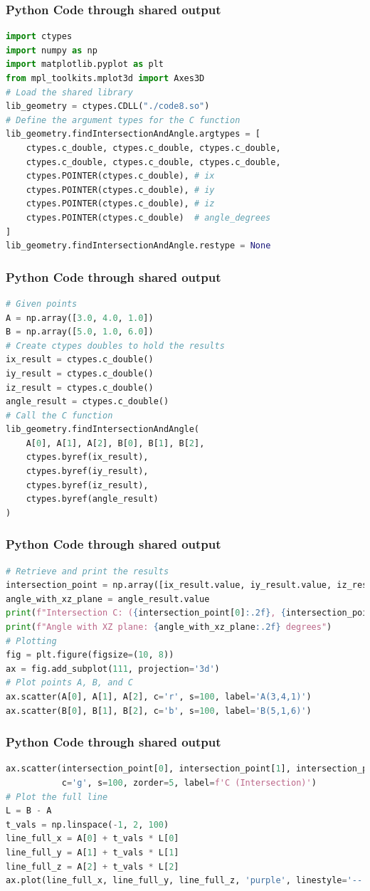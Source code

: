 \documentclass{beamer}
\begin{document}
\begin{frame}[fragile]
\frametitle{Python Code through shared output}
\begin{lstlisting}[language=Python]
import ctypes
import numpy as np
import matplotlib.pyplot as plt
from mpl_toolkits.mplot3d import Axes3D
# Load the shared library
lib_geometry = ctypes.CDLL("./code8.so")
# Define the argument types for the C function
lib_geometry.findIntersectionAndAngle.argtypes = [
    ctypes.c_double, ctypes.c_double, ctypes.c_double,
    ctypes.c_double, ctypes.c_double, ctypes.c_double,
    ctypes.POINTER(ctypes.c_double), # ix
    ctypes.POINTER(ctypes.c_double), # iy
    ctypes.POINTER(ctypes.c_double), # iz
    ctypes.POINTER(ctypes.c_double)  # angle_degrees
]
lib_geometry.findIntersectionAndAngle.restype = None
\end{lstlisting}
\end{frame}
\begin{frame}[fragile]
\frametitle{Python Code through shared output}
\begin{lstlisting}[language=Python]
# Given points
A = np.array([3.0, 4.0, 1.0])
B = np.array([5.0, 1.0, 6.0])
# Create ctypes doubles to hold the results
ix_result = ctypes.c_double()
iy_result = ctypes.c_double()
iz_result = ctypes.c_double()
angle_result = ctypes.c_double()
# Call the C function
lib_geometry.findIntersectionAndAngle(
    A[0], A[1], A[2], B[0], B[1], B[2],
    ctypes.byref(ix_result),
    ctypes.byref(iy_result),
    ctypes.byref(iz_result),
    ctypes.byref(angle_result)
)
\end{lstlisting}
\end{frame}
\begin{frame}[fragile]
\frametitle{Python Code through shared output}
\begin{lstlisting}[language=Python]
# Retrieve and print the results
intersection_point = np.array([ix_result.value, iy_result.value, iz_result.value])
angle_with_xz_plane = angle_result.value
print(f"Intersection C: ({intersection_point[0]:.2f}, {intersection_point[1]:.2f}, {intersection_point[2]:.2f})")
print(f"Angle with XZ plane: {angle_with_xz_plane:.2f} degrees")
# Plotting
fig = plt.figure(figsize=(10, 8))
ax = fig.add_subplot(111, projection='3d')
# Plot points A, B, and C
ax.scatter(A[0], A[1], A[2], c='r', s=100, label='A(3,4,1)')
ax.scatter(B[0], B[1], B[2], c='b', s=100, label='B(5,1,6)')
\end{lstlisting}
\end{frame}
\begin{frame}[fragile]
\frametitle{Python Code through shared output}
\begin{lstlisting}[language=Python]
ax.scatter(intersection_point[0], intersection_point[1], intersection_point[2],
           c='g', s=100, zorder=5, label=f'C (Intersection)')
# Plot the full line
L = B - A
t_vals = np.linspace(-1, 2, 100)
line_full_x = A[0] + t_vals * L[0]
line_full_y = A[1] + t_vals * L[1]
line_full_z = A[2] + t_vals * L[2]
ax.plot(line_full_x, line_full_y, line_full_z, 'purple', linestyle='--', label='Line')
\end{lstlisting}
\end{frame}
\end{document}
